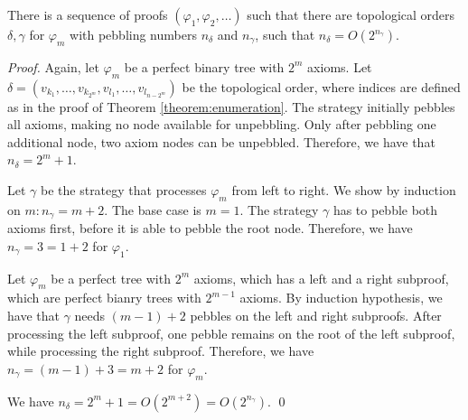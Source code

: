 \begin{theorem}
\label{theorem:enumeration}
There is a sequence of proofs $(\varphi_1,\varphi_2,\ldots)$ such that there are topological orders $\delta, \gamma$ for $\varphi_m$ with pebbling numbers $n_\delta$ and $n_\gamma$, such that $n_\delta = O(2^{n_\gamma})$.
\end{theorem}
\begin{proof}
Again, let $\varphi_m$ be a perfect binary tree with $2^{m}$ axioms.
Let $\delta = (v_{k_1},\ldots,v_{k_{2^m}},v_{l_1},\ldots,v_{l_{n-{2^m}}})$ be the topological order, where indices are defined as in the proof of Theorem \ref{theorem:enumeration}.
The strategy initially pebbles all axioms, making no node available for unpebbling.
Only after pebbling one additional node, two axiom nodes can be unpebbled.
Therefore, we have that $n_\delta = 2^m + 1$.

Let $\gamma$ be the strategy that processes $\varphi_m$ from left to right.
We show by induction on $m: n_\gamma = m+2$.
The base case is $m = 1$.
The strategy $\gamma$ has to pebble both axioms first, before it is able to pebble the root node.
Therefore, we have $n_\gamma = 3 = 1 + 2$ for $\varphi_1$.

Let $\varphi_m$ be a perfect tree with $2^m$ axioms, which has a left and a right subproof, which are perfect bianry trees with $2^{m-1}$ axioms.
By induction hypothesis, we have that $\gamma$ needs $(m -1) + 2$ pebbles on the left and right subproofs.
After processing the left subproof, one pebble remains on the root of the left subproof, while processing the right subproof.
Therefore, we have $n_\gamma = (m - 1) + 3 = m + 2$ for $\varphi_m$.

We have $n_\delta = 2^m + 1 = O(2^{m+2}) = O(2^{n_\gamma})$. \hspace*{\fill} \qed
\end{proof}